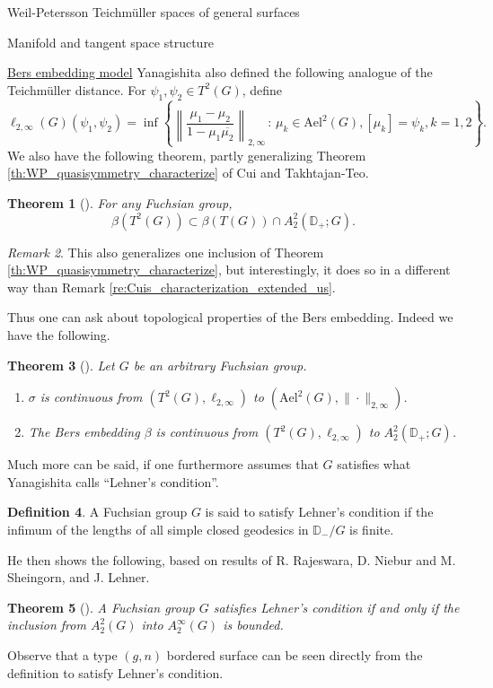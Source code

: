 \documentclass[12pt]{amsart}
\newcommand{\disk}{\ensuremath{\mathbb{D}} } %
\theoremstyle{plain}
\newtheorem{theorem}{Theorem}[section]
\theoremstyle{definition}
\newtheorem{definition}[theorem]{Definition}
\theoremstyle{remark}
\newtheorem{remark}[theorem]{Remark}
\numberwithin{equation}{section} %
\numberwithin{figure}{section} %
\begin{document}
\begin{section}{Weil-Petersson Teichm\"uller spaces of general surfaces}
\begin{subsection}{Manifold and tangent space structure}
\begin{subsubsection}{{\underline{Bers embedding model}}}
  Yanagishita also defined the following analogue of the Teichm\"uller distance. For $\psi_1,\psi_2 \in T^2(G)$, define
  \[ \ell_{2,\infty}(G)(\psi_1,\psi_2) = \inf \left\{ \left\| \frac{\mu_1 - \mu_2}{1- \mu_1 \overline{\mu_2}} \right\|_{2,\infty} \,: \, \mu_k \in \mathrm{Ael}^2(G), [\mu_k]=\psi_k, k=1,2 \right\}.
  \]
 We also have the following theorem, partly generalizing Theorem \ref{th:WP_quasisymmetry_characterize} of Cui and Takhtajan-Teo. 
 \begin{theorem}[\cite{Yanagishita}]
  For any Fuchsian group, 
  \[ \beta(T^2(G)) \subset \beta(T(G)) \cap A^2_2(\disk_+;G). \]
 \end{theorem} 
 \begin{remark} This also generalizes one inclusion of Theorem \ref{th:WP_quasisymmetry_characterize}, but interestingly, it does so in a different way than Remark \ref{re:Cuis_characterization_extended_us}.
 \end{remark}

 Thus one can ask about topological properties of the Bers embedding. Indeed we have the following. 
 \begin{theorem}[\cite{Yanagishita}]
  Let $G$ be an arbitrary Fuchsian group.
  \begin{enumerate}
   \item $\sigma$ is continuous from $\left(T^2(G),\ell_{2,\infty}\right)$ to $\left(\mathrm{Ael}^2(G), \| \cdot \|_{2,\infty}\right)$. 
   \item The Bers embedding $\beta$ is continuous from $(T^2(G),\ell_{2,\infty})$ to $A^2_2(\disk_+;G)$. 
  \end{enumerate}
 \end{theorem}

 Much more can be said, if one furthermore assumes that $G$ satisfies what Yanagishita calls ``Lehner's condition''. 
 \begin{definition} A Fuchsian group $G$ is said to satisfy Lehner's condition if the infimum of the lengths of all simple closed geodesics in $\disk_-/G$ is finite. 
 \end{definition}
 He then shows the following, based on results of R. Rajeswara, D. Niebur and M. Sheingorn, and J. Lehner.
 \begin{theorem}[\cite{Yanagishita}] \label{th:Lehner_and_inclusion}
  A Fuchsian group $G$ satisfies Lehner's condition if and only if the inclusion from $A^2_2(G)$ into $A^\infty_2(G)$ is bounded. 
 \end{theorem}
 Observe that a type $(g,n)$ bordered surface can be seen directly from the definition to satisfy Lehner's condition.


\end{subsubsection}
\end{subsection}
\end{section}
\end{document}
